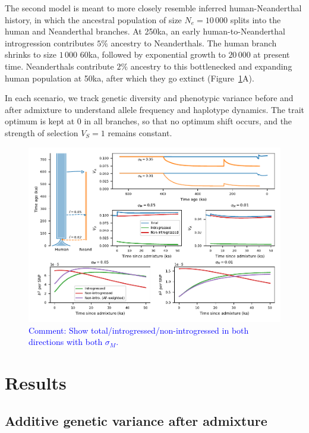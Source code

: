 \documentclass{article}
\newcommand{\aprcomment}[1]{{\textcolor{blue}{Comment: #1}}}
\begin{document}
The second model is meant to more closely resemble inferred human-Neanderthal
history, in which the ancestral population of size $N_e=10\,000$ splits into
the human and Neanderthal branches. At 250ka, an early human-to-Neanderthal
introgression contributes $5\%$ ancestry to Neanderthals. The human branch
shrinks to size $1\,000$ 60ka, followed by exponential growth to $20\,000$ at
present time. Neanderthals contribute $2\%$ ancestry to this bottlenecked and
expanding human population at 50ka, after which they go extinct
(Figure~\ref{fig:neand-to-human}A).

In each scenario, we track genetic diversity and phenotypic variance before and
after admixture to understand allele frequency and haplotype dynamics. The
trait optimum is kept at $0$ in all branches, so that no optimum shift occurs,
and the strength of selection $V_S=1$ remains constant.

\begin{figure}[t!]
    \centering
    \includegraphics{../figures/neanderthal_admixture.pdf}
    \caption{
        \textbf{}
        \aprcomment{Show total/introgressed/non-introgressed in both directions
        with both $\sigma_M$.}
    }
    \label{fig:neand-to-human}
\end{figure}

\section*{Results}

\subsection*{Additive genetic variance after admixture}
\end{document}
